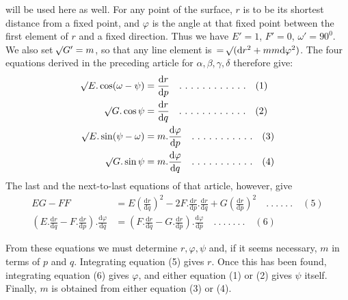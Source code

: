 %
will be used here as well. For any point of the surface, \(r\) is to be its shortest distance from a fixed point, and \(\varphi\) is the angle at that fixed point between the first element of \(r\) and a fixed direction. Thus we have \(E'=1\), \(F'=0\), \(\omega'=90^0\). We also set \(\mathord{{}^{}\!\surd}G'=m\), so that any line element \mbox{is \(=\mathord{{}^{}\!\surd}(\mathrm{d}r^2+mm\mathrm{d}\varphi^2)\)}. The four equations derived in the preceding article for \(\alpha,\beta,\gamma,\delta\) therefore give:
\[
\begin{aligned}
\mathord{{}^{}\!\surd}E\mathord{.}\cos(\omega-\psi)&=\frac{\mathrm{d}r}{\mathrm{d}p}\quad .\ .\ .\ .\ .\ .\ .\ .\ .\ .\ .\ .\quad(1)\\
\mathord{{}^{}\!\surd}G\mathord{.}\cos\psi&=\frac{\mathrm{d}r}{\mathrm{d}q}\quad .\ .\ .\ .\ .\ .\ .\ .\ .\ .\ .\ .\quad(2)\\
\mathord{{}^{}\!\surd}E\mathord{.}\sin(\psi-\omega)&=m\mathord{.}\frac{\mathrm{d}\varphi}{\mathrm{d}p}\quad .\ .\ .\ .\ .\ .\ .\ .\ .\ .\ .\quad(3)\\
\mathord{{}^{}\!\surd}G\mathord{.}\sin\psi&=m\mathord{.}\frac{\mathrm{d}\varphi}{\mathrm{d}q}\quad .\ .\ .\ .\ .\ .\ .\ .\ .\ .\ .\quad(4)
\end{aligned}
\]
The last and the next-to-last equations of that article, however, give
\[
\begin{aligned}
EG-FF&=E(\frac{\mathrm{d}r}{\mathrm{d}q})^2-2F\mathord{.}\frac{\mathrm{d}r}{\mathrm{d}p}\mathord{.}\frac{\mathrm{d}r}{\mathrm{d}q}+G(\frac{\mathrm{d}r}{\mathrm{d}p})^2\quad .\ .\ .\ .\ .\ .\quad(5)\\
(E\mathord{.}\frac{\mathrm{d}r}{\mathrm{d}q}-F\mathord{.}\frac{\mathrm{d}r}{\mathrm{d}p})\mathord{.}\frac{\mathrm{d}\varphi}{\mathrm{d}q}&=(F\mathord{.}\frac{\mathrm{d}r}{\mathrm{d}q}-G\mathord{.}\frac{\mathrm{d}r}{\mathrm{d}p})\mathord{.}\frac{\mathrm{d}\varphi}{\mathrm{d}p}\quad .\ .\ .\ .\ .\ .\ .\quad(6)
\end{aligned}
\]

From these equations we must determine \(r,\varphi,\psi\) and, if it seems necessary, \(m\) in terms of \(p\) and \(q\). Integrating equation (5) gives \(r\). Once this has been found, integrating equation (6) gives \(\varphi\), and either equation (1) or (2) gives \(\psi\) itself. Finally, \(m\) is obtained from either equation (3) or (4).

